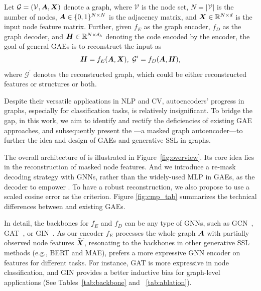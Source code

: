 Let $\mathcal{G}=(\mathcal{V}, {\bm{A}}, {\bm{X}})$ denote a graph, where $\mathcal{V}$ is the node set, $N=|\mathcal{V}|$ is the number of nodes, ${\bm{A}} \in \{0,1\}^{N\times N}$ is the adjacency matrix, and ${\bm{X}} \in \mathbb{R}^{N\times d}$ is the input node feature matrix. 
Further, given $f_E$ as the graph encoder, 
$f_D$ as the graph decoder, 
and ${\bm{H}} \in \mathbb{R}^{N\times d_h}$ denoting the code encoded by the encoder, 
the goal of general GAEs is to reconstruct the input as 
\begin{equation}
    \begin{split}
        {\bm{H}} = f_E({\bm{A}}, {\bm{X}}), \ \mathcal{G}^{\prime} = f_D({\bm{A}}, {\bm{H}}),
    \end{split}
\end{equation}
where $\mathcal{G}^{\prime}$ denotes the reconstructed graph, which could be either reconstructed features or structures or both.  


Despite their versatile applications in NLP and CV, autoencoders' progress in graphs, especially for classification tasks, is relatively insignificant. 
To bridge the gap, in this work, we aim to identify and rectify the  deficiencies of existing GAE approaches, and subsequently present the \model---a masked graph autoencoder---to further the idea and design of GAEs and generative SSL in graphs. 


The overall architecture of \model is illustrated in Figure~\ref{fig:overview}. 
Its core idea lies in the reconstruction of masked node features. %
And we introduce a re-mask decoding strategy with GNNs, rather than the widely-used MLP in GAEs, as the decoder to empower \model.
To have a robust reconstruction, we also propose to use a scaled cosine error as the criterion. 
Figure \ref{fig:cmp_tab} summarizes the technical differences between %
\model and existing GAEs. 


In detail, the backbones for $f_E$ and $f_D$ can be any type of GNNs, such as GCN~\cite{thomas2017gcn}, GAT~\cite{petar2018gat}, or GIN~\cite{xu2019powerful}. 
As our encoder $f_E$ processes the whole graph ${\bm{A}}$ with partially observed node features $\widetilde{{\bm{X}}}$, resonating to the backbones in other generative SSL methods (e.g., BERT and MAE), 
\model prefers a 
more expressive GNN encoder on features for different tasks. 
For instance, GAT is more expressive in node classification, and GIN provides a better inductive bias for graph-level applications (See Tables~\ref{tab:backbone} and ~\ref{tab:ablation}). 

